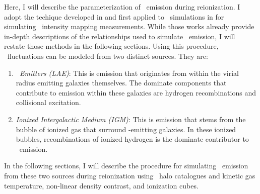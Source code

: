 Here, I will describe the parameterization of \lya\ emission during reionization.
I adopt the techique developed in \cite{2013ApJ...763..132S} and first applied to \fastsim\ simulations
in \cite{2017ApJ...848...52H} for simulating \lya\ intensity mapping measurements.
While those works already provide in-depth descriptions of the relationships used to simulate
\lya\ emission, I will restate those methods in the following sections. Using this
procedure, \lya\ fluctuations can be modeled from two distinct sources. They are:

\begin{enumerate}
\item \textit{\lya\ Emitters (LAE)}: This is emission that originates from within the
              virial radius \lya\-emitting galaxies themselves. The dominate components
              that contribute to emission within these galaxies are hydrogen recombinations
              and collisional excitation.
\item \textit{Ionized Intergalactic Medium (IGM)}: This is emission that stems from the bubble
              of ionized gas that surround \lya-emitting galaxies. In these ionized bubbles,
              recombinations of ionized hydrogen is the dominate contributor to \lya\ emission.
\end{enumerate}

In the following sections, I will describe the procedure for simulating \lya\
emission from these two sources during reionization using \fastsim\ halo catalogues
and kinetic gas temperature, non-linear density contrast, and ionization cubes.
